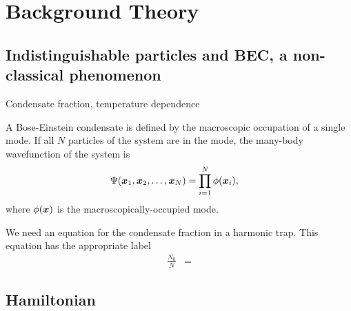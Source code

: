 \chapter{Background Theory}
\label{BackgroundTheory}
\graphicspath{{Figures/BackgroundTheory/}{Figures/Common/}}


\section{Indistinguishable particles and BEC, a non-classical phenomenon}

Condensate fraction, temperature dependence

A Bose-Einstein condensate is defined by the macroscopic occupation of a single mode.  If all $N$ particles of the system are in the mode, the many-body wavefunction of the system is
\begin{align}
    \Psi(\vect{x}_1, \vect{x}_2, \dots, \vect{x}_N) &= \prod_{i=1}^{N} \phi(\vect{x}_i), \label{BackgroundTheory:ManyBodyWavefunction}
\end{align}
where $\phi(\bm{x})$ is the macroscopically-occupied mode.  

We need an equation for the condensate fraction in a harmonic trap.  This equation has the appropriate label
\begin{align}
    \frac{N_0}{N} &= \label{BackgroundTheory:CondensateFractionHarmonicTrap}
\end{align}

\section{Hamiltonian}

